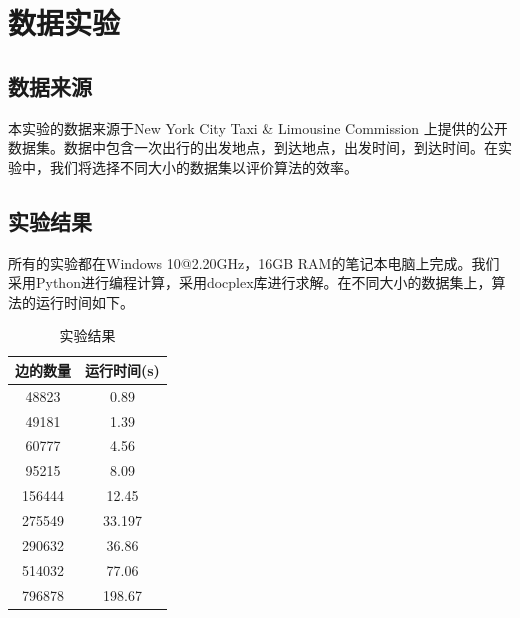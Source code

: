 \section{数据实验}
\subsection{数据来源}
本实验的数据来源于New York City Taxi \& Limousine Commission 上提供的公开数据集。数据中包含一次出行的出发地点，到达地点，出发时间，到达时间。在实验中，我们将选择不同大小的数据集以评价算法的效率。
\subsection{实验结果}
所有的实验都在Windows 10@2.20GHz，16GB RAM的笔记本电脑上完成。我们采用Python进行编程计算，采用docplex库进行求解。在不同大小的数据集上，算法的运行时间如下。
\begin{table}
\centering
\caption{实验结果}
\label{tab:exp}
\begin{tabular}{|c|c|}
\hline
边的数量 & 运行时间(s)\\
\hline
\hline
48823 & 0.89 \\
\hline
49181 & 1.39\\
\hline
60777 & 4.56\\
\hline
95215 & 8.09\\
\hline
156444 & 12.45 \\
\hline
275549 & 33.197\\
\hline
290632 & 36.86\\
\hline
514032 & 77.06\\
\hline
796878 & 198.67 \\
\hline
\end{tabular}
\end{table}